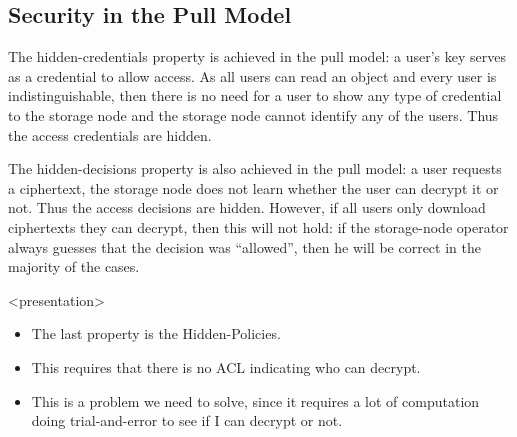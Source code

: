 \subsection{Security in the Pull Model}\label{sec:PullModelSec}

%
%
%
%

The hidden-credentials property is achieved in the pull model: a user's key 
serves as a credential to allow access.
As all users can read an object and every user is indistinguishable, then there 
is no need for a user to show any type of credential to the storage node and 
the storage node cannot identify any of the users.
Thus the access credentials are hidden.

%
%
%
%

The hidden-decisions property is also achieved in the pull model: a user 
requests a ciphertext, the storage node does not learn whether the user can 
decrypt it or not.
Thus the access decisions are hidden.
However, if all users only download ciphertexts they can decrypt, then this 
will not hold:
if the storage-node operator always guesses that the decision was 
\enquote{allowed}, then he will be correct in the majority of the cases.

\begin{frame}<presentation>
  \begin{itemize}

    \item The last property is the Hidden-Policies.
      
    \item This requires that there is no \ac{ACL} indicating who can decrypt.

    \item This is a problem we need to solve, since it requires a lot of 
      computation doing trial-and-error to see if I can decrypt or not.

  \end{itemize}
\end{frame}

